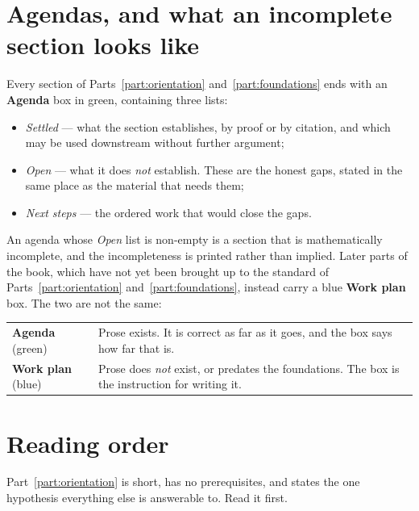 \section*{Agendas, and what an incomplete section looks like}

Every section of Parts~\ref{part:orientation} and~\ref{part:foundations}
ends with an \textbf{Agenda} box in green, containing three lists:

\begin{itemize}
  \item \textit{Settled} --- what the section establishes, by proof or by
        citation, and which may be used downstream without further argument;
  \item \textit{Open} --- what it does \emph{not} establish. These are the
        honest gaps, stated in the same place as the material that needs them;
  \item \textit{Next steps} --- the ordered work that would close the gaps.
\end{itemize}

An agenda whose \textit{Open} list is non-empty is a section that is
mathematically incomplete, and the incompleteness is printed rather than
implied. Later parts of the book, which have not yet been brought up to the
standard of Parts~\ref{part:orientation} and~\ref{part:foundations}, instead
carry a blue \textbf{Work plan} box. The two are not the same:

\begin{center}
\begin{tabular}{@{}>{\raggedright\arraybackslash}p{}%
                  >{\raggedright\arraybackslash}p{}@{}}
\toprule
\textsf{\textbf{\color{examplecol}Agenda}} (green) &
  Prose exists. It is correct as far as it goes, and the box says how far
  that is.\\
\addlinespace[3pt]
\textsf{\textbf{\color{linkblue}Work plan}} (blue) &
  Prose does \emph{not} exist, or predates the foundations. The box is the
  instruction for writing it.\\
\bottomrule
\end{tabular}
\end{center}

\section*{Reading order}

Part~\ref{part:orientation} is short, has no prerequisites, and states the
one hypothesis everything else is answerable to. Read it first.

